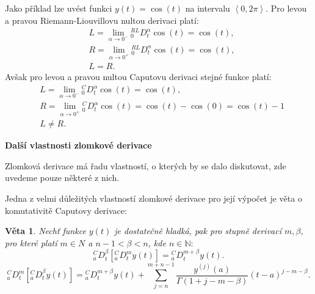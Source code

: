 \documentclass[a4paper,12pt,twoside]{article}
\newtheorem{veta}{Věta}[section]
\theoremstyle{definition}
\theoremstyle{remark}
\numberwithin{equation}{section}
\numberwithin{table}{section}
\numberwithin{figure}{section}
\newcommand{\N}{\mathbb{N}}
\begin{document}
Jako příklad lze uvést funkci $y\left(t\right) =  \cos{\left(t\right)}$ na intervalu $\left\langle 0, 2\pi \right\rangle$. Pro levou a pravou \linebreak Riemann-Liouvillovu nultou derivaci platí:
\begin{align}
	&L = \lim\limits_{\alpha \to 0^{-}} {_{0}^{RL}D^{\alpha}_{t}} \cos{\left(t\right)} = \cos{\left(t\right)}, \\
	&R = \lim\limits_{\alpha \to {0}^{+}} {_{0}^{RL}D^{\alpha}_{t}} \cos{\left(t\right)} = \cos{\left(t\right)}, \\
	&L = R.
\end{align}
Avšak pro levou a pravou nultou Caputovu derivaci stejné funkce platí:
\begin{align}
	&L = \lim\limits_{\alpha \to 0^{-}} {_{0}^{C}D^{\alpha}_{t}} \cos{\left(t\right)} = \cos{\left(t\right)}, \\
	&R = \lim\limits_{\alpha \to {0}^{+}} {_{0}^{C}D^{\alpha}_{t}} \cos{\left(t\right)} = \cos{\left(t\right)}  - \cos{\left(0\right)} = \cos{\left(t\right)} - 1 \\
	&L \neq R.
\end{align}

\medskip
\noindent \textbf{Další vlastnosti zlomkové derivace}

\medskip
\noindent Zlomková derivace má řadu vlastností, o kterých by se dalo diskutovat, zde uvedeme pouze některé z nich.

Jedna z velmi důležitých vlastností zlomkové derivace pro její výpočet je věta o komutativitě Caputovy derivace:

\begin{veta} \label{CaputovaKomutativita}
	Nechť funkce $y\left(t\right)$ je dostatečně hladká, pak pro stupně derivací $m, \beta$, pro které platí $m \in N$ a $n-1 < \beta < n$, kde $n \in \N:$	
	$$
		{_{a}^{C}D^{\beta}_{t}} \left[  {_{a}^{C}D^{m}_{t}} y\left(t\right)\right] = {_{a}^{C}D^{m + \beta}_{t}} y\left(t\right).
	$$
	$$
		{_{a}^{C}D^{m}_{t}} \left[  {_{a}^{C}D^{\beta}_{t}} y\left(t\right)\right] = {_{a}^{C}D^{m + \beta}_{t}} y\left(t\right) + \sum_{j=n}^{m+n-1} \frac{y^{\left(j\right)}\left(a\right)}{\Gamma \left(1+j-m- \beta\right)} \left(t-a\right)^{j-m-\beta}.
	$$
\end{veta}
\end{document}
